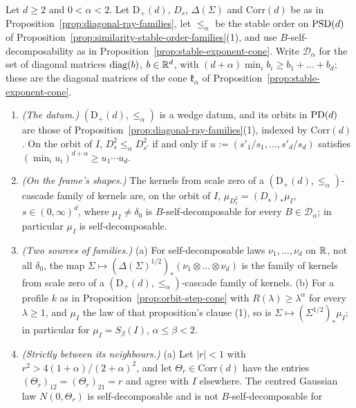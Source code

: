 \begin{proposition}\label{prop:diagonal-stable-order-families}
Let $d \ge 2$ and $0 < \alpha < 2$. Let $\mathrm D_+(d)$, $D_s$, $\Delta(\Sigma)$ and $\mathrm{Corr}(d)$ be as
in Proposition~\ref{prop:diagonal-ray-families}, let $\le_\alpha$ be the stable order on $\mathrm{PSD}(d)$ of
Proposition~\ref{prop:similarity-stable-order-families}(1), and use $B$-self-decomposability as in
Proposition~\ref{prop:stable-exponent-cone}. Write $\mathcal D_\alpha$ for the set of diagonal matrices $\operatorname{diag}(b)$,
$b \in \mathbb{R}^d$, with $(d+\alpha)\min_ib_i \ge b_1 + \dots + b_d$; these are the diagonal matrices of the
cone $\mathfrak k_\alpha$ of Proposition~\ref{prop:stable-exponent-cone}.
\begin{enumerate}
\item \emph{(The datum.)} $(\mathrm D_+(d), \le_\alpha)$ is a wedge datum, and its orbits in $\mathrm{PD}(d)$ are
those of Proposition~\ref{prop:diagonal-ray-families}(1), indexed by $\mathrm{Corr}(d)$. On the orbit of $I$,
$D_s^2 \le_\alpha D_{s'}^2$ if and only if $u := (s'_1/s_1, \dots, s'_d/s_d)$ satisfies
$(\min_iu_i)^{d+\alpha} \ge u_1\cdots u_d$.
\item \emph{(On the frame's shapes.)} The kernels from scale zero of a
$(\mathrm D_+(d), \le_\alpha)$-cascade family of kernels are, on the orbit of $I$,
$\mu_{D_s^2} = (D_s)_*\mu_I$, $s \in (0,\infty)^d$, where $\mu_I \ne \delta_0$ is $B$-self-decomposable for
every $B \in \mathcal D_\alpha$; in particular $\mu_I$ is self-decomposable.
\item \emph{(Two sources of families.)} (a) For self-decomposable laws $\nu_1, \dots, \nu_d$ on $\mathbb{R}$, not
all $\delta_0$, the map $\Sigma \mapsto (\Delta(\Sigma)^{1/2})_*(\nu_1 \otimes \dots \otimes \nu_d)$ is the
family of kernels from scale zero of a $(\mathrm D_+(d), \le_\alpha)$-cascade family of kernels.
(b) For a profile $k$ as in Proposition~\ref{prop:orbit-step-cone} with $R(\lambda) \ge \lambda^\alpha$ for every
$\lambda \ge 1$, and $\mu_I$ the law of that proposition's clause (1), so is $\Sigma \mapsto (\Sigma^{1/2})_*\mu_I$;
in particular for $\mu_I = S_\beta(I)$, $\alpha \le \beta < 2$.
\item \emph{(Strictly between its neighbours.)} (a) Let $|r| < 1$ with $r^2 > 4(1+\alpha)/(2+\alpha)^2$, and
let $\Theta_r \in \mathrm{Corr}(d)$ have the entries $(\Theta_r)_{12} = (\Theta_r)_{21} = r$ and agree with $I$ elsewhere.
The centred Gaussian law $N(0, \Theta_r)$ is self-decomposable and is not $B$-self-decomposable for

\end{enumerate}
\end{proposition}
